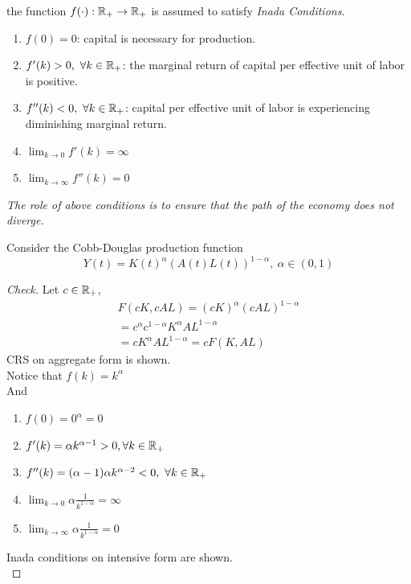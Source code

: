 \documentclass[]{article}
\begin{document}
			\begin{assumption} the function $f(\cdot): \mathbb{R}_+ \rightarrow \mathbb{R}_+$ is assumed to satisfy \emph{Inada Conditions}.
				\begin{enumerate}
					\item $f(0) = 0$: capital is necessary for production.
					\item $f'(k) > 0,\ \forall k \in \mathbb{R}_+$: the marginal return of capital per effective unit of labor is positive.
					\item $f''(k) < 0,\ \forall k \in \mathbb{R}_+$: capital per effective unit of labor is experiencing diminishing marginal return.
					\item $\lim_{k \to 0}f'(k) = \infty$
					\item $\lim_{k \to \infty}f''(k) = 0$
				\end{enumerate}
				\emph{The role of above conditions is to ensure that the path of the economy does not diverge.}
			\end{assumption}
			
			\begin{example}
				Consider the Cobb-Douglas production function
				\[
					Y(t) = K(t)^\alpha (A(t)L(t))^{1 - \alpha},\ \alpha \in (0, 1)
				\]
				
				\begin{proof}[Check]
					Let $c \in \mathbb{R}_+$, 
					\begin{gather*}
						F(cK, cAL) = (cK)^\alpha (cAL)^{1 - \alpha} \\
						= c^\alpha c^{1-\alpha} K^\alpha AL^{1-\alpha} \\
						= cK^{\alpha} AL^{1-\alpha} = cF(K, AL)
					\end{gather*}
					CRS on aggregate form is shown. \\
					Notice that $f(k) = k^{\alpha}$ \\
					And 
					\begin{enumerate}
						\item $f(0) = 0^{\alpha} = 0$
						\item $f'(k) = \alpha k ^ {\alpha - 1} > 0, \forall k \in \mathbb{R}_+$
						\item $f''(k) = (\alpha - 1)\alpha k ^ {\alpha - 2} < 0, \ \forall k \in \mathbb{R}_+$
						\item $\lim_{k \to 0} \alpha \frac{1}{k^{1-\alpha}} = \infty$
						\item $\lim_{k \to \infty} \alpha \frac{1}{k^{1-\alpha}} = 0$
					\end{enumerate}
					Inada conditions on intensive form are shown. \\
				\end{proof}
			\end{example}
			
\end{document}

